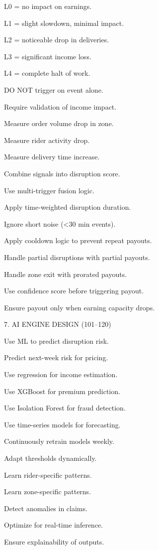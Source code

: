 L0 = no impact on earnings. 

L1 = slight slowdown, minimal impact. 

L2 = noticeable drop in deliveries. 

L3 = significant income loss. 

L4 = complete halt of work. 

DO NOT trigger on event alone. 

Require validation of income impact. 

Measure order volume drop in zone. 

Measure rider activity drop. 

Measure delivery time increase. 

Combine signals into disruption score. 

Use multi-trigger fusion logic. 

Apply time-weighted disruption duration. 

Ignore short noise (<30 min events). 

Apply cooldown logic to prevent repeat payouts. 

Handle partial disruptions with partial payouts. 

Handle zone exit with prorated payouts. 

Use confidence score before triggering payout. 

Ensure payout only when earning capacity drops. 

 

 7. AI ENGINE DESIGN (101–120) 

Use ML to predict disruption risk. 

Predict next-week risk for pricing. 

Use regression for income estimation. 

Use XGBoost for premium prediction. 

Use Isolation Forest for fraud detection. 

Use time-series models for forecasting. 

Continuously retrain models weekly. 

Adapt thresholds dynamically. 

Learn rider-specific patterns. 

Learn zone-specific patterns. 

Detect anomalies in claims. 

Optimize for real-time inference. 

Ensure explainability of outputs. 


